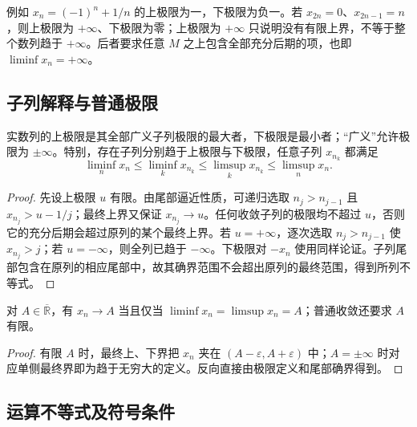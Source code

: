 例如 $x_n=(-1)^n+1/n$ 的上极限为一，下极限为负一。若 $x_{2n}=0$、$x_{2n-1}=n$，则上极限为 $+\infty$、下极限为零；上极限为 $+\infty$ 只说明没有有限上界，不等于整个数列趋于 $+\infty$。后者要求任意 $M$ 之上包含全部充分后期的项，也即 $\liminf x_n=+\infty$。

\subsection{子列解释与普通极限}

\begin{theorem}
\label{thm:pei-limsup-subsequences}
实数列的上极限是其全部广义子列极限的最大者，下极限是最小者；“广义”允许极限为 $\pm\infty$。特别，存在子列分别趋于上极限与下极限，任意子列 $x_{n_k}$ 都满足
\[
    \liminf_nx_n\le\liminf_kx_{n_k}
       \le\limsup_kx_{n_k}\le\limsup_nx_n.
\]
\end{theorem}
\begin{proof}
先设上极限 $u$ 有限。由尾部逼近性质，可递归选取 $n_j>n_{j-1}$ 且 $x_{n_j}>u-1/j$；最终上界又保证 $x_{n_j}\to u$。任何收敛子列的极限均不超过 $u$，否则它的充分后期会超过原列的某个最终上界。若 $u=+\infty$，逐次选取 $n_j>n_{j-1}$ 使 $x_{n_j}>j$；若 $u=-\infty$，则全列已趋于 $-\infty$。下极限对 $-x_n$ 使用同样论证。子列尾部包含在原列的相应尾部中，故其确界范围不会超出原列的最终范围，得到所列不等式。
\end{proof}

\begin{corollary}
\label{cor:pei-limsup-convergence}
对 $A\in\overline{\mathbb{R}}$，有 $x_n\to A$ 当且仅当 $\liminf x_n=\limsup x_n=A$；普通收敛还要求 $A$ 有限。
\end{corollary}
\begin{proof}
有限 $A$ 时，最终上、下界把 $x_n$ 夹在 $(A-\varepsilon,A+\varepsilon)$ 中；$A=\pm\infty$ 时对应单侧最终界即为趋于无穷大的定义。反向直接由极限定义和尾部确界得到。
\end{proof}

\subsection{运算不等式及符号条件}

